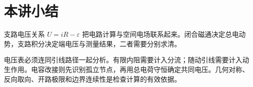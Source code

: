 \section{本讲小结}
支路电压关系 $U=iR-\varepsilon$ 把电路计算与空间电场联系起来。闭合磁通决定总电动势，支路积分决定端电压与测量结果，二者需要分别求清。

电压表必须连同引线路径一起分析。有限内阻需要计入分流；随动引线需要计入动生作用。电容改接则先识别孤立节点，再用总电荷守恒确定共同电压。几何对称、反向取向、开路极限和边界连续性是检查计算的有效依据。
